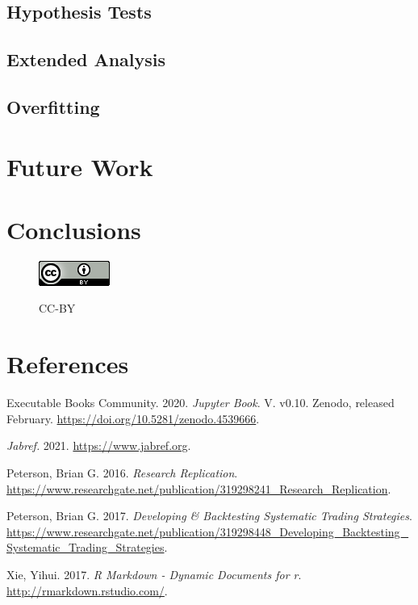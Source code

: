 \documentclass{article}
\newlength{\cslhangindent}
\newenvironment{CSLReferences}[2] %
 {\begin{list}{}{%
  \setlength{\itemindent}{0pt}
  \setlength{\leftmargin}{0pt}
  \setlength{\parsep}{0pt}
  \ifodd #1
   \setlength{\leftmargin}{\cslhangindent}
   \setlength{\itemindent}{-1\cslhangindent}
  \fi
  \setlength{\itemsep}{#2\baselineskip}}}
 {\end{list}}
\providecommand{\pandocbounded}[1]{#1} %
\begin{document}
\subsection{Hypothesis Tests}\label{hypothesis-tests}

\subsection{Extended Analysis}\label{extended-analysis}

\subsection{Overfitting}\label{overfitting}

\section{Future Work}\label{future-work}

\section{Conclusions}\label{conclusions}

\newpage

\begin{figure}
\centering
\pandocbounded{\includegraphics[keepaspectratio,alt={CC-BY}]{cc_by_88x31.png}}
\caption{CC-BY}
\end{figure}

\section*{References}\label{references}

\protect{}\label{refs}
\begin{CSLReferences}{1}{1}
Executable Books Community. 2020. \emph{Jupyter Book}. V. v0.10. Zenodo,
released February. \url{https://doi.org/10.5281/zenodo.4539666}.

\emph{Jabref.} 2021. \url{https://www.jabref.org}.

Peterson, Brian G. 2016. \emph{Research Replication}.
\url{https://www.researchgate.net/publication/319298241_Research_Replication}.

Peterson, Brian G. 2017. \emph{Developing \& Backtesting Systematic
Trading Strategies}.
\url{https://www.researchgate.net/publication/319298448_Developing_Backtesting_Systematic_Trading_Strategies}.

Xie, Yihui. 2017. \emph{R Markdown - Dynamic Documents for r}.
\url{http://rmarkdown.rstudio.com/}.

\end{CSLReferences}



\end{document}
